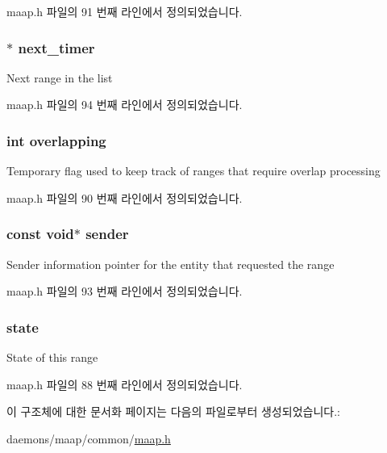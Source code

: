 maap.\+h 파일의 91 번째 라인에서 정의되었습니다.

\subsubsection[{\texorpdfstring{next\+\_\+timer}{next_timer}}]{$\ast$ next\+\_\+timer}\hypertarget{structrange_a3c89fc489da1e4f9bad21fbdb15e2386}{}\label{structrange_a3c89fc489da1e4f9bad21fbdb15e2386}
Next range in the list 

maap.\+h 파일의 94 번째 라인에서 정의되었습니다.

\subsubsection[{\texorpdfstring{overlapping}{overlapping}}]{\setlength{\rightskip}{0pt plus 5cm}int overlapping}\hypertarget{structrange_a2525856385331d88032dd796949d83ab}{}\label{structrange_a2525856385331d88032dd796949d83ab}
Temporary flag used to keep track of ranges that require overlap processing 

maap.\+h 파일의 90 번째 라인에서 정의되었습니다.

\subsubsection[{\texorpdfstring{sender}{sender}}]{\setlength{\rightskip}{0pt plus 5cm}const void$\ast$ sender}\hypertarget{structrange_a6da9953a2443ab3bd33eea3534c01fdd}{}\label{structrange_a6da9953a2443ab3bd33eea3534c01fdd}
Sender information pointer for the entity that requested the range 

maap.\+h 파일의 93 번째 라인에서 정의되었습니다.

\subsubsection[{\texorpdfstring{state}{state}}]{ state}\hypertarget{structrange_afb8e4b0a842160bfedbee377952d8dde}{}\label{structrange_afb8e4b0a842160bfedbee377952d8dde}
State of this range 

maap.\+h 파일의 88 번째 라인에서 정의되었습니다.



이 구조체에 대한 문서화 페이지는 다음의 파일로부터 생성되었습니다.\+:\begin{DoxyCompactItemize}
\item 
daemons/maap/common/\hyperlink{maap_8h}{maap.\+h}\end{DoxyCompactItemize}
